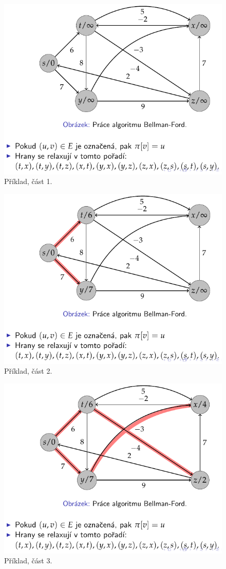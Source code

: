 \begin{figure}[H]
    \centering
    \includegraphics[width=0.75\linewidth]{example_bellman_ford_p1.pdf}
    \caption{Příklad, část 1.}
\end{figure}

\begin{figure}[H]
    \centering
    \includegraphics[width=0.75\linewidth]{example_bellman_ford_p2.pdf}
    \caption{Příklad, část 2.}
\end{figure}

\begin{figure}[H]
    \centering
    \includegraphics[width=0.75\linewidth]{example_bellman_ford_p3.pdf}
    \caption{Příklad, část 3.}
\end{figure}

